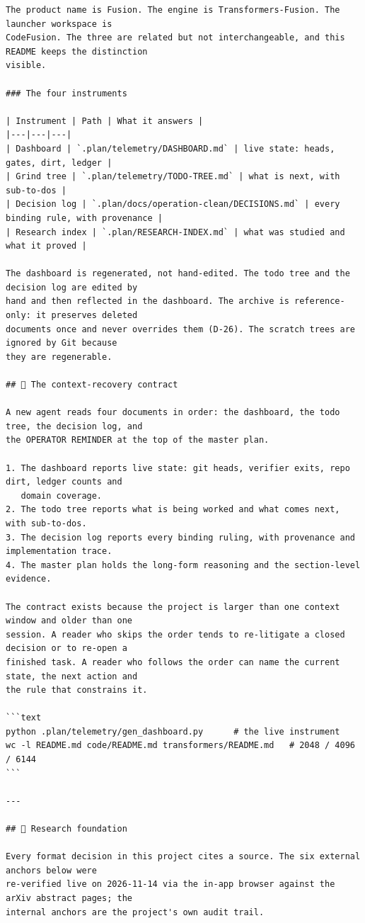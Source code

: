 \begin{Verbatim}[breaklines,breakanywhere,fontsize=\footnotesize]
The product name is Fusion. The engine is Transformers-Fusion. The launcher workspace is
CodeFusion. The three are related but not interchangeable, and this README keeps the distinction
visible.

### The four instruments

| Instrument | Path | What it answers |
|---|---|---|
| Dashboard | `.plan/telemetry/DASHBOARD.md` | live state: heads, gates, dirt, ledger |
| Grind tree | `.plan/telemetry/TODO-TREE.md` | what is next, with sub-to-dos |
| Decision log | `.plan/docs/operation-clean/DECISIONS.md` | every binding rule, with provenance |
| Research index | `.plan/RESEARCH-INDEX.md` | what was studied and what it proved |

The dashboard is regenerated, not hand-edited. The todo tree and the decision log are edited by
hand and then reflected in the dashboard. The archive is reference-only: it preserves deleted
documents once and never overrides them (D-26). The scratch trees are ignored by Git because
they are regenerable.

## 🧭 The context-recovery contract

A new agent reads four documents in order: the dashboard, the todo tree, the decision log, and
the OPERATOR REMINDER at the top of the master plan.

1. The dashboard reports live state: git heads, verifier exits, repo dirt, ledger counts and
   domain coverage.
2. The todo tree reports what is being worked and what comes next, with sub-to-dos.
3. The decision log reports every binding ruling, with provenance and implementation trace.
4. The master plan holds the long-form reasoning and the section-level evidence.

The contract exists because the project is larger than one context window and older than one
session. A reader who skips the order tends to re-litigate a closed decision or to re-open a
finished task. A reader who follows the order can name the current state, the next action and
the rule that constrains it.

```text
python .plan/telemetry/gen_dashboard.py      # the live instrument
wc -l README.md code/README.md transformers/README.md   # 2048 / 4096 / 6144
```

---

## 🔬 Research foundation

Every format decision in this project cites a source. The six external anchors below were
re-verified live on 2026-11-14 via the in-app browser against the arXiv abstract pages; the
internal anchors are the project's own audit trail.


\end{Verbatim}
